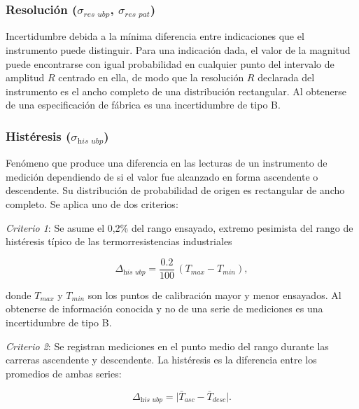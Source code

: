 \subsubsection{Resolución ($\sigma_{\textit{res ubp}}$, $\sigma_{\textit{res pat}}$)}

Incertidumbre debida a la mínima diferencia entre indicaciones que el instrumento puede distinguir. Para una indicación dada, el valor de la magnitud puede encontrarse con igual probabilidad en cualquier punto del intervalo de amplitud $R$ centrado en ella, de modo que la resolución $R$ declarada del instrumento es el ancho completo de una distribución rectangular. Al obtenerse de una especificación de fábrica es una incertidumbre de tipo B. 


\subsubsection{Histéresis ($\sigma_{\textit{his ubp}}$)}

Fenómeno que produce una diferencia en las lecturas de un instrumento de medición dependiendo de si el valor fue alcanzado en forma ascendente o descendente. Su distribución de probabilidad de origen es rectangular de ancho completo. Se aplica uno de dos criterios:

\textit{Criterio 1}: Se asume el 0,2\% del rango ensayado, extremo pesimista del rango de histéresis típico de las termorresistencias industriales

\begin{equation}
    \Delta_{\textit{his ubp}} = \frac{0.2}{100}\,(T_{max} - T_{min}),
\end{equation}

donde $T_{max}$ y $T_{min}$ son los puntos de calibración mayor y menor ensayados\cite{DKD8.10}. Al obtenerse de información conocida y no de una serie de mediciones es una incertidumbre de tipo B.


\textit{Criterio 2}: Se registran mediciones en el punto medio del rango durante las carreras ascendente y descendente. La histéresis es la diferencia entre los promedios de ambas series\cite{DKD8.10}:

\begin{equation}
    \Delta_{\textit{his ubp}} = \lvert \bar{T}_{asc} - \bar{T}_{desc} \rvert.
\end{equation}

